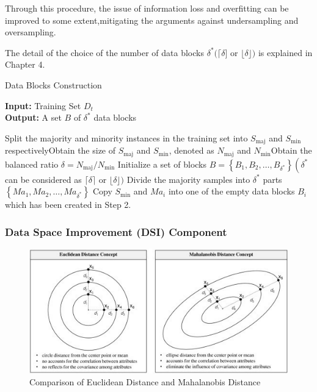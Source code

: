Through this procedure, the issue of information loss and overfitting can be improved to some extent,mitigating the arguments against undersampling and oversampling.

The detail of the choice of the number of data blocks $\delta^{*}(\lceil\delta]$ or $\lfloor\delta\rfloor)$ is explained in Chapter 4.
\begin{algorithm}[h]
    \caption{Data Blocks Construction}
    \label{algo1}
    \hspace*{0.02in} {\bf Input:} Training Set $D_{t}$\\
    \hspace*{0.02in} {\bf Output:} A set $B$ of $\delta^{*}$ data blocks
    \begin{algorithmic}[1]
        \State Split the majority and minority instances in the training set into $S_{\text{maj}}$ and $S_{\min}$ respectively\newline Obtain the size of $S_{\text{maj}}$ and $S_{\min}$, denoted as $N_{\text{maj}}$ and $N_{\min}$\newline Obtain the balanced ratio $\delta=N_{\text{maj}} / N_{\min}$
        \State Initialize a set of blocks $B=\left\{B_{1}, B_{2}, \ldots, B_{\delta^{*}}\right\}$\newline $\left(\delta^{*}\right.$ can be considered as $\lceil\delta\rceil$ or $\lfloor\delta\rfloor)$
        \State Divide the majority samples into $\delta^{*}$ parts $\left\{M a_{1}, M a_{2}, \ldots, M a_{\delta^{*}}\right\}$
        \State Copy $S_{\min }$ and $M a_{i}$ into one of the empty data blocks $B_{i}$ which has been created in Step 2.
    \end{algorithmic}
\end{algorithm}

\subsubsection{Data Space Improvement (DSI) Component}
\begin{figure}[h]
    \centering 
    \includegraphics[width=\textwidth]{images/fig7}
    \caption{Comparison of Euclidean Distance and Mahalanobis Distance \cite[Fig.1]{76}}
    \label{fig7}
\end{figure}


